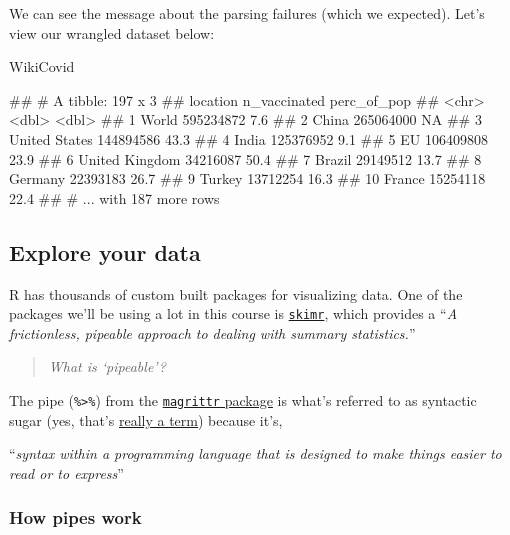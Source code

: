 \documentclass[11pt,]{article}
\newenvironment{Shaded}{\begin{snugshade}}{\end{snugshade}}
\newcommand{\NormalTok}[1]{#1}
\let\oldShaded\Shaded
\let\endoldShaded\endShaded
\renewenvironment{Shaded}{\footnotesize\oldShaded}{\endoldShaded}
\let\oldverbatim\verbatim
\let\endoldverbatim\endverbatim
\renewenvironment{verbatim}{\footnotesize\oldverbatim}{\endoldverbatim}
\begin{document}
We can see the message about the parsing failures (which we expected).
Let's view our wrangled dataset below:

\begin{Shaded}
\begin{Highlighting}[]
\NormalTok{WikiCovid}
\end{Highlighting}
\end{Shaded}

\begin{verbatim}
## # A tibble: 197 x 3
##    location       n_vaccinated perc_of_pop
##    <chr>                 <dbl>       <dbl>
##  1 World             595234872         7.6
##  2 China             265064000        NA  
##  3 United States     144894586        43.3
##  4 India             125376952         9.1
##  5 EU                106409808        23.9
##  6 United Kingdom     34216087        50.4
##  7 Brazil             29149512        13.7
##  8 Germany            22393183        26.7
##  9 Turkey             13712254        16.3
## 10 France             15254118        22.4
## # ... with 187 more rows
\end{verbatim}

\hypertarget{explore-your-data}{%
\subsection{Explore your data}\label{explore-your-data}}

R has thousands of custom built packages for visualizing data. One of
the packages we'll be using a lot in this course is
\href{https://docs.ropensci.org/skimr/}{\texttt{skimr}}, which provides
a ``\emph{A frictionless, pipeable approach to dealing with summary
statistics.}''

\begin{quote}
\emph{What is `pipeable'?}
\end{quote}

The pipe (\texttt{\%\textgreater{}\%}) from the
\href{https://magrittr.tidyverse.org/}{\texttt{magrittr} package} is
what's referred to as syntactic sugar (yes, that's
\href{https://en.wikipedia.org/wiki/Syntactic_sugar}{really a term})
because it's,

``\emph{syntax within a programming language that is designed to make
things easier to read or to express}''

\hypertarget{how-pipes-work}{%
\subsubsection{How pipes work}\label{how-pipes-work}}
\end{document}
